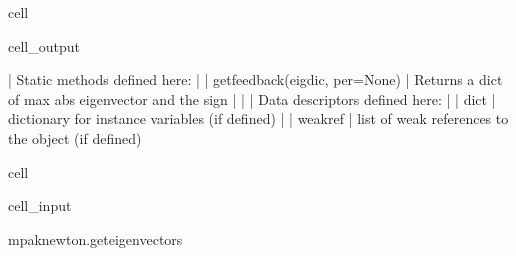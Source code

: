 \documentclass[letterpaper,10pt,english]{jupyterBook}
\begin{document}
\begin{sphinxuseclass}{cell}
\begin{sphinxVerbatimOutput}
\begin{sphinxuseclass}{cell_output}
\begin{sphinxVerbatim}[commandchars=\\\{\}]
 |  Static methods defined here:
 |  
 |  get\PYGZus{}feedback(eig\PYGZus{}dic, per=None)
 |      Returns a dict of max abs eigenvector and the sign
 |  
 |  \PYGZhy{}\PYGZhy{}\PYGZhy{}\PYGZhy{}\PYGZhy{}\PYGZhy{}\PYGZhy{}\PYGZhy{}\PYGZhy{}\PYGZhy{}\PYGZhy{}\PYGZhy{}\PYGZhy{}\PYGZhy{}\PYGZhy{}\PYGZhy{}\PYGZhy{}\PYGZhy{}\PYGZhy{}\PYGZhy{}\PYGZhy{}\PYGZhy{}\PYGZhy{}\PYGZhy{}\PYGZhy{}\PYGZhy{}\PYGZhy{}\PYGZhy{}\PYGZhy{}\PYGZhy{}\PYGZhy{}\PYGZhy{}\PYGZhy{}\PYGZhy{}\PYGZhy{}\PYGZhy{}\PYGZhy{}\PYGZhy{}\PYGZhy{}\PYGZhy{}\PYGZhy{}\PYGZhy{}\PYGZhy{}\PYGZhy{}\PYGZhy{}\PYGZhy{}\PYGZhy{}\PYGZhy{}\PYGZhy{}\PYGZhy{}\PYGZhy{}\PYGZhy{}\PYGZhy{}\PYGZhy{}\PYGZhy{}\PYGZhy{}\PYGZhy{}\PYGZhy{}\PYGZhy{}\PYGZhy{}\PYGZhy{}\PYGZhy{}\PYGZhy{}\PYGZhy{}\PYGZhy{}\PYGZhy{}\PYGZhy{}\PYGZhy{}\PYGZhy{}\PYGZhy{}
 |  Data descriptors defined here:
 |  
 |  \PYGZus{}\PYGZus{}dict\PYGZus{}\PYGZus{}
 |      dictionary for instance variables (if defined)
 |  
 |  \PYGZus{}\PYGZus{}weakref\PYGZus{}\PYGZus{}
 |      list of weak references to the object (if defined)
\end{sphinxVerbatim}

\end{sphinxuseclass}\end{sphinxVerbatimOutput}

\end{sphinxuseclass}
\begin{sphinxuseclass}{cell}\begin{sphinxVerbatimInput}

\begin{sphinxuseclass}{cell_input}
\begin{sphinxVerbatim}[commandchars=\\\{\}]
mpak\PYGZus{}newton.get\PYGZus{}eigenvectors
\end{sphinxVerbatim}

\end{sphinxuseclass}\end{sphinxVerbatimInput}

\end{sphinxuseclass}
\end{document}

